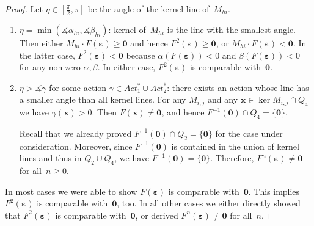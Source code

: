 \documentclass[10pt,a4paper]{amsart}
\newcommand{\eps}{\bm{\varepsilon}}
\begin{document}
\begin{proof}
		
		Let $\eta \in [\frac{\pi}{2}, \pi]$ be the angle of the kernel line of~$M_{hi}$.
		\begin{enumerate}
			\item $\eta = \min(\measuredangle \alpha_{hi}, \measuredangle \beta_{hi})$: kernel of~$M_{hi}$ is the line with the smallest angle. Then 
			either $M_{hi}\cdot F(\eps) \geq \bm{0}$ and hence $F^2(\eps) \geq \bm{0}$, or $M_{hi} \cdot F(\eps) < \bm{0}$. In the latter case, $F^2(\eps) < \bm{0}$ because $\alpha(F(\eps)) < 0$ and $\beta(F(\eps)) < 0$ for any non-zero $\alpha,\beta$. 
			In either case,	$F^2(\eps)$ is comparable with~$\bm{0}$.
			\item $\eta > \measuredangle\gamma$ for some action $\gamma \in Act_1^* \cup Act_2^*$: there exists an action whose line has a smaller angle than all kernel lines.
		For any $M_{i,j}$ and any $\bm{x} \in \ker M_{i,j} \cap Q_4$ we have $\gamma(\bm{x}) > 0$. Then $F(\bm{x}) \neq \bm{0}$, and hence $F^{-1}(\bm{0}) \cap Q_4 = \{\bm{0}\}$.
			
			Recall that we already proved $F^{-1}(\bm{0}) \cap Q_2 = \{\bm{0}\}$ for the case under consideration.
		Moreover, since $F^{-1}(\bm{0})$ is contained in the union of kernel lines and thus in $Q_2 \cup Q_4$, we have $F^{-1}(\bm{0}) = \{\bm{0}\}$.
		Therefore, $F^n(\eps) \neq \bm{0}$ for all~$n\geq 0$.
		\end{enumerate}
		
		In most cases we were able to show $F(\eps)$ is comparable with~$\bm{0}$. This implies $F^2(\eps)$ is comparable with~$\bm{0}$, too.
		In all other cases we either directly showed that $F^2(\eps)$ is comparable with~$\bm{0}$, or derived $F^n(\eps) \neq \bm{0}$ for all~$n$.
\end{proof}
\end{document}

